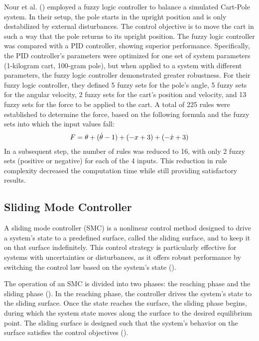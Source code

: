 Nour et al. (\citeyear{nour_fuzzy_2007}) employed a fuzzy logic controller to balance a simulated Cart-Pole system. In their setup, the pole starts in the upright position and is only destabilized by external disturbances. The control objective is to move the cart in such a way that the pole returns to its upright position. The fuzzy logic controller was compared with a PID controller, showing superior performance. Specifically, the PID controller's parameters were optimized for one set of system parameters (1-kilogram cart, 100-gram pole), but when applied to a system with different parameters, the fuzzy logic controller demonstrated greater robustness. For their fuzzy logic controller, they defined 5 fuzzy sets for the pole's angle, 5 fuzzy sets for the angular velocity, 2 fuzzy sets for the cart's position and velocity, and 13 fuzzy sets for the force to be applied to the cart. A total of 225 rules were established to determine the force, based on the following formula and the fuzzy sets into which the input values fall:
\begin{align}
    F = \theta + (\dot{\theta}-1) + (-x+3) + (-\dot{x}+3) \notag
\end{align}
In a subsequent step, the number of rules was reduced to 16, with only 2 fuzzy sets (positive or negative) for each of the 4 inputs. This reduction in rule complexity decreased the computation time while still providing satisfactory results.

\subsection{Sliding Mode Controller}

A sliding mode controller (SMC) is a nonlinear control method designed to drive a system's state to a predefined surface, called the sliding surface, and to keep it on that surface indefinitely. This control strategy is particularly effective for systems with uncertainties or disturbances, as it offers robust performance by switching the control law based on the system's state (\cite{edwards_sliding_1998}).

The operation of an SMC is divided into two phases: the reaching phase and the sliding phase (\cite{uswarman_robust_2019}). In the reaching phase, the controller drives the system's state to the sliding surface. Once the state reaches the surface, the sliding phase begins, during which the system state moves along the surface to the desired equilibrium point. The sliding surface is designed such that the system's behavior on the surface satisfies the control objectives (\cite{maarif_sliding_2022}).

